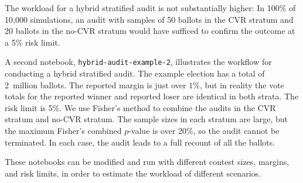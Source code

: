 \documentclass[runningheads]{llncs}
\newcommand{\comment}[1]{}
\begin{document}
The workload for a hybrid stratified audit is not substantially higher:
In 100\% of 10,000 simulations, an audit with samples of 50 ballots in the 
CVR stratum and 20 ballots in the no-CVR stratum
would have sufficed to confirm the outcome at a 5\% risk limit.
\comment{Maybe reduce the sample size until there are some failures? It looks like there's a lot of slack...}

A second notebook, \texttt{hybrid-audit-example-2}, illustrates the workflow for conducting a hybrid 
stratified audit.
The example election has a total of 2~million ballots.
The reported margin is just over $1\%$, but in reality the vote totals for the reported winner
and reported loser are identical in both strata.  The risk limit is 5\%.
We use Fisher's method to combine the audits in the CVR stratum and no-CVR stratum.
The sample sizes in each stratum are large, but the maximum Fisher's combined $p$-value is over 20\%,
so the audit cannot be terminated.
In each case, the audit leads to a full recount of all the ballots.

These notebooks can be modified and run with different contest sizes, margins, and risk limits, in order to
estimate the workload of different scenarios.


\end{document}
